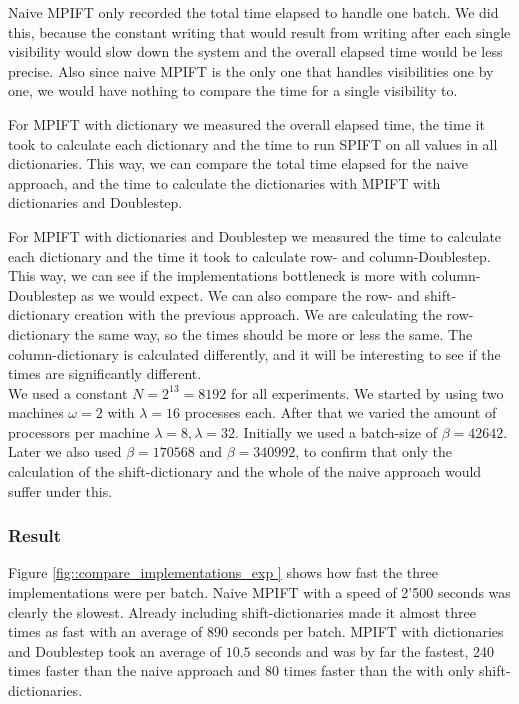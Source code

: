 \documentclass[12pt]{article}
\begin{document}
Naive MPIFT only recorded the total time elapsed to handle one batch. We did this, because the constant writing that would result from writing after each single visibility would slow down the system and the overall elapsed time would be less precise.  Also since naive MPIFT is the only one that handles visibilities one by one, we would have nothing to compare the time for a single visibility to.

For MPIFT with dictionary we measured the overall elapsed time, the time it took to calculate each dictionary and the time to run SPIFT on all values in all dictionaries. This way, we can compare the total time elapsed for the naive approach, and the time to calculate the dictionaries with MPIFT with dictionaries and Doublestep.

For MPIFT with dictionaries and Doublestep we measured the time to calculate each dictionary and the time it took to calculate row- and column-Doublestep. This way, we can see if the implementations bottleneck is more with column-Doublestep as we would expect. We can also compare the row- and shift-dictionary creation with the previous approach. We are calculating the row-dictionary the same way, so the times should be more or less the same. The column-dictionary is calculated differently, and it will be interesting to see if the times are significantly different.\\

We used a constant $N=2^{13}=8192$ for all experiments. We started by using two machines $\omega=2$ with $\lambda=16$ processes each. After that we varied the amount of processors per machine $\lambda=8,\lambda=32$. Initially we used a batch-size of $\beta=42642$. Later we also used $\beta=170568$ and $\beta=340992$, to confirm that only the calculation of the shift-dictionary and the whole of the naive approach would suffer under this.
 

\subsubsection{Result}
\label{sec::result}

Figure \ref{fig::compare_implementations_exp } shows how fast the three implementations were per batch. Naive MPIFT with a speed of 2'500  seconds was clearly the slowest. Already including shift-dictionaries made it almost three times as fast with an average of 890 seconds per batch. MPIFT with dictionaries and Doublestep took an average of $10.5$ seconds and was by far the fastest, 240 times faster than the naive approach and 80 times faster than the with only shift-dictionaries. 
\end{document}
